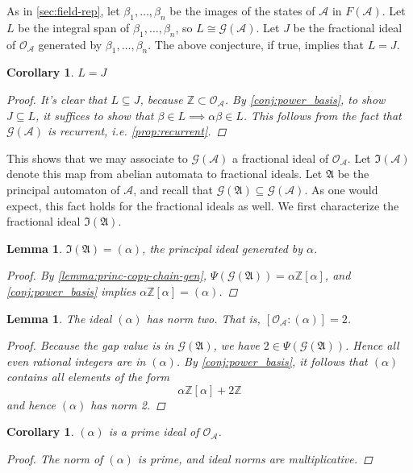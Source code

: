 \documentclass[12pt, letterpaper]{article}
\newcommand{\Z}{\mathbb Z}
\newcommand{\A}{\mathcal A}
\newcommand{\princ}{\mathfrak A}
\newcommand{\gp}{\mathcal G}
\newcommand{\ideal}{\mathfrak{I}}
\newtheorem{lemma}[thm]{Lemma}
\newtheorem{cor}[thm]{Corollary}
\begin{document}
As in \cref{sec:field-rep}, let $\beta_1,\ldots,\beta_n$ be the images of
the states of $\A$ in $F(\A)$. Let $L$ be the integral span of
$\beta_1,\ldots,\beta_n$, so $L \cong \gp(\A)$. Let $J$ be the fractional ideal
of $\mathcal{O}_\A$ generated by $\beta_1,\ldots,\beta_n$. The above
conjecture, if true, implies that $L = J$.
\begin{cor}
    $L = J$
    \begin{proof}
         It's clear that $L \subseteq J$, because $\Z \subset \mathcal{O}_\A$.
         By \cref{conj:power_basis}, to show $J \subseteq L$, it suffices to
         show that $\beta \in L \implies \alpha \beta \in L$. This follows from
         the fact that $\gp(\A)$ is recurrent, i.e. \cref{prop:recurrent}.
    \end{proof}
\end{cor}
This shows that we may associate to $\gp(\A)$ a fractional ideal of
$\mathcal{O}_\A$. Let $\ideal(\A)$ denote this map from abelian automata to
fractional ideals. Let $\princ$ be the principal automaton of $\A$, and recall
that $\gp(\princ) \subseteq \gp(\A)$. As one would expect, this fact holds for
the fractional ideals as well. We first characterize the fractional ideal
$\ideal(\princ)$.
\begin{lemma}\label{lemma:princ-ideal-alpha}
    $\ideal(\princ) = (\alpha)$, the principal ideal generated by $\alpha$.
    \begin{proof}
        By \cref{lemma:princ-copy-chain-gen}, $\Psi(\gp(\princ)) =
        \alpha \Z[\alpha]$, and \cref{conj:power_basis} implies
        $\alpha \Z[\alpha] = (\alpha)$.
    \end{proof}
\end{lemma}
\begin{lemma}\label{lemma:alpha_ideal_index_2}
    The ideal $(\alpha)$ has norm two. That is,
    $[\mathcal{O}_\A : (\alpha)] = 2$.
    \begin{proof}
        Because the gap value is in $\gp(\princ)$, we have
        $2 \in \Psi(\gp(\princ))$. Hence all even rational integers are in
        $(\alpha)$. By \cref{conj:power_basis}, it follows that $(\alpha)$
        contains all elements of the form
        \[
            \alpha \Z[\alpha] + 2 \Z
        \]
        and hence $(\alpha)$ has norm 2.
    \end{proof}
\end{lemma}
\begin{cor}\label{cor:alpha_prime_ideal}
    $(\alpha)$ is a prime ideal of $\mathcal{O}_\A$.
    \begin{proof}
        The norm of $(\alpha)$ is prime, and ideal norms are multiplicative.
    \end{proof}
\end{cor}
\end{document}
